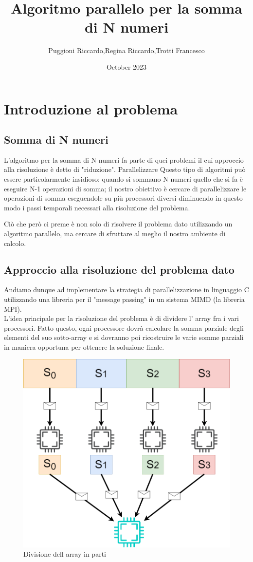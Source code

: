 \documentclass{article}
\title{Algoritmo parallelo per la somma di N numeri}
\author{Puggioni Riccardo,Regina Riccardo,Trotti Francesco }
\date{October 2023}
\begin{document}
\maketitle

\section{Introduzione al problema}
\subsection{Somma di N numeri}
    L'algoritmo per la somma di N numeri fa parte di quei problemi
    il cui approccio alla risoluzione è detto di "riduzione".
    Parallelizzare Questo tipo di algoritmi può essere particolarmente insidioso:
    quando si sommano N numeri quello che si fa è eseguire N-1
    operazioni di somma; il nostro obiettivo è cercare di parallelizzare le operazioni di somma eseguendole su più processori diversi diminuendo in questo modo i passi temporali necessari alla risoluzione del problema.

    Ciò che però ci preme è non solo di risolvere il problema
    dato utilizzando un algoritmo parallelo, ma cercare di sfruttare al meglio il nostro ambiente di calcolo.
\subsection{Approccio alla risoluzione del problema dato}

   

    Andiamo dunque ad implementare la strategia di parallelizzazione in linguaggio C utilizzando una libreria per il "message passing" in un sistema MIMD (la libreria MPI).
    \\
    L'idea principale per la risoluzione del problema è di dividere l' array fra i vari processori.
    Fatto questo, ogni processore dovrà calcolare la somma parziale degli elementi del suo sotto-array
    e si dovranno poi ricostruire le varie somme parziali in maniera opportuna per ottenere la soluzione finale.\\
    \begin{figure}[!htbp]
        \includegraphics[width=0.3\linewidth,center]{divisione_array.drawio.png}
        \caption{Divisione dell array in parti}
        \label{fig:enter-label}
    \end{figure}  
    
\end{document}

